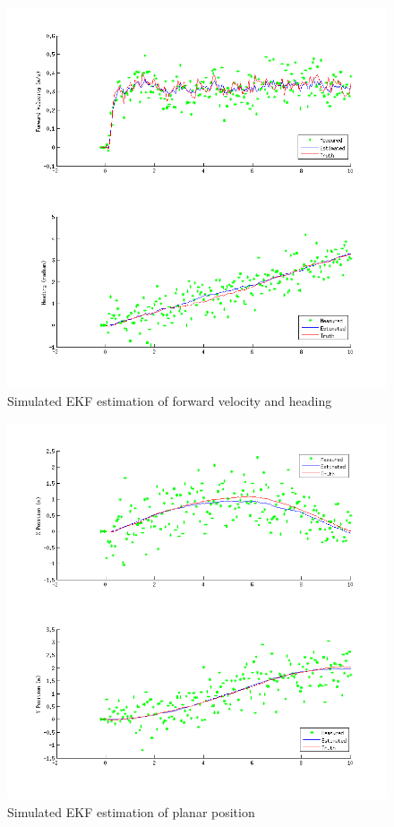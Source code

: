 \documentclass[11pt]{article} %
\begin{document}
\begin{figure}[hbt]
 \centering
 \includegraphics[scale=0.60]{ekf_sim_vh.png}
 \caption{Simulated EKF estimation of forward velocity and heading}
 \label{ekf_s_vh}
\end{figure}

\begin{figure}[hbt]
  \centering
  \includegraphics[scale=0.60]{ekf_sim_xy.png}
  \caption{Simulated EKF estimation of planar position}
  \label{ekf_s_xy}
\end{figure}
\end{document}
